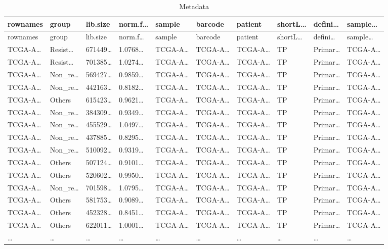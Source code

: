 \documentclass[
]{article}
\begin{document}
\begin{longtable}[]{@{}llllllllll@{}}
\caption{\label{tab:metadata}Metadata}\tabularnewline
\toprule
rownames & group & lib.size & norm.f\ldots{} & sample & barcode & patient & shortL\ldots{} & defini\ldots{} & sample\ldots{}\tabularnewline
\midrule
\endfirsthead
\toprule
rownames & group & lib.size & norm.f\ldots{} & sample & barcode & patient & shortL\ldots{} & defini\ldots{} & sample\ldots{}\tabularnewline
\midrule
\endhead
TCGA-A\ldots{} & Resist\ldots{} & 671449\ldots{} & 1.0768\ldots{} & TCGA-A\ldots{} & TCGA-A\ldots{} & TCGA-A\ldots{} & TP & Primar\ldots{} & TCGA-A\ldots{}\tabularnewline
TCGA-A\ldots{} & Resist\ldots{} & 701385\ldots{} & 1.0274\ldots{} & TCGA-A\ldots{} & TCGA-A\ldots{} & TCGA-A\ldots{} & TP & Primar\ldots{} & TCGA-A\ldots{}\tabularnewline
TCGA-A\ldots{} & Non\_re\ldots{} & 569427\ldots{} & 0.9859\ldots{} & TCGA-A\ldots{} & TCGA-A\ldots{} & TCGA-A\ldots{} & TP & Primar\ldots{} & TCGA-A\ldots{}\tabularnewline
TCGA-A\ldots{} & Non\_re\ldots{} & 442163\ldots{} & 0.8182\ldots{} & TCGA-A\ldots{} & TCGA-A\ldots{} & TCGA-A\ldots{} & TP & Primar\ldots{} & TCGA-A\ldots{}\tabularnewline
TCGA-A\ldots{} & Others & 615423\ldots{} & 0.9621\ldots{} & TCGA-A\ldots{} & TCGA-A\ldots{} & TCGA-A\ldots{} & TP & Primar\ldots{} & TCGA-A\ldots{}\tabularnewline
TCGA-A\ldots{} & Non\_re\ldots{} & 384309\ldots{} & 0.9349\ldots{} & TCGA-A\ldots{} & TCGA-A\ldots{} & TCGA-A\ldots{} & TP & Primar\ldots{} & TCGA-A\ldots{}\tabularnewline
TCGA-A\ldots{} & Non\_re\ldots{} & 455529\ldots{} & 1.0497\ldots{} & TCGA-A\ldots{} & TCGA-A\ldots{} & TCGA-A\ldots{} & TP & Primar\ldots{} & TCGA-A\ldots{}\tabularnewline
TCGA-A\ldots{} & Non\_re\ldots{} & 437885\ldots{} & 0.8295\ldots{} & TCGA-A\ldots{} & TCGA-A\ldots{} & TCGA-A\ldots{} & TP & Primar\ldots{} & TCGA-A\ldots{}\tabularnewline
TCGA-A\ldots{} & Non\_re\ldots{} & 510092\ldots{} & 0.9319\ldots{} & TCGA-A\ldots{} & TCGA-A\ldots{} & TCGA-A\ldots{} & TP & Primar\ldots{} & TCGA-A\ldots{}\tabularnewline
TCGA-A\ldots{} & Others & 507124\ldots{} & 0.9101\ldots{} & TCGA-A\ldots{} & TCGA-A\ldots{} & TCGA-A\ldots{} & TP & Primar\ldots{} & TCGA-A\ldots{}\tabularnewline
TCGA-A\ldots{} & Others & 520602\ldots{} & 0.9950\ldots{} & TCGA-A\ldots{} & TCGA-A\ldots{} & TCGA-A\ldots{} & TP & Primar\ldots{} & TCGA-A\ldots{}\tabularnewline
TCGA-A\ldots{} & Non\_re\ldots{} & 701598\ldots{} & 1.0795\ldots{} & TCGA-A\ldots{} & TCGA-A\ldots{} & TCGA-A\ldots{} & TP & Primar\ldots{} & TCGA-A\ldots{}\tabularnewline
TCGA-A\ldots{} & Others & 581753\ldots{} & 0.9089\ldots{} & TCGA-A\ldots{} & TCGA-A\ldots{} & TCGA-A\ldots{} & TP & Primar\ldots{} & TCGA-A\ldots{}\tabularnewline
TCGA-A\ldots{} & Others & 452328\ldots{} & 0.8451\ldots{} & TCGA-A\ldots{} & TCGA-A\ldots{} & TCGA-A\ldots{} & TP & Primar\ldots{} & TCGA-A\ldots{}\tabularnewline
TCGA-A\ldots{} & Others & 622011\ldots{} & 1.0001\ldots{} & TCGA-A\ldots{} & TCGA-A\ldots{} & TCGA-A\ldots{} & TP & Primar\ldots{} & TCGA-A\ldots{}\tabularnewline
\ldots{} & \ldots{} & \ldots{} & \ldots{} & \ldots{} & \ldots{} & \ldots{} & \ldots{} & \ldots{} & \ldots{}\tabularnewline
\bottomrule
\end{longtable}
\end{document}
